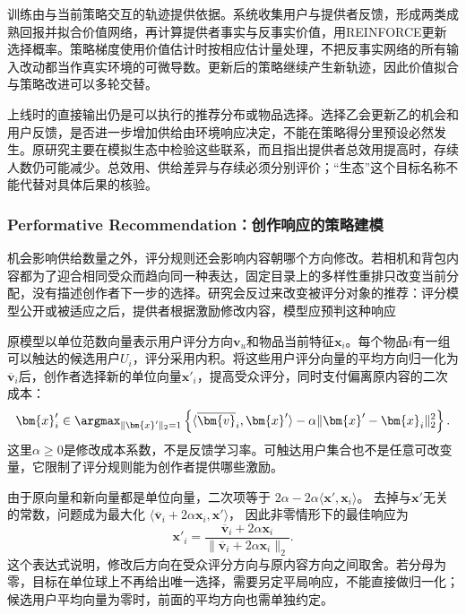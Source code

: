 训练由与当前策略交互的轨迹提供依据。系统收集用户与提供者反馈，形成两类成熟回报并拟合价值网络，再计算提供者事实与反事实价值，用REINFORCE更新选择概率。策略梯度使用价值估计时按相应估计量处理，不把反事实网络的所有输入改动都当作真实环境的可微导数。更新后的策略继续产生新轨迹，因此价值拟合与策略改进可以多轮交替。

上线时的直接输出仍是可以执行的推荐分布或物品选择。选择乙会更新乙的机会和用户反馈，是否进一步增加供给由环境响应决定，不能在策略得分里预设必然发生。原研究主要在模拟生态中检验这些联系，而且指出提供者总效用提高时，存续人数仍可能减少。总效用、供给差异与存续必须分别评价；“生态”这个目标名称不能代替对具体后果的核验。

\subsubsection{Performative Recommendation：创作响应的策略建模}
\label{sec:rs-performative-recommendation}

机会影响供给数量之外，评分规则还会影响内容朝哪个方向修改。若相机和背包内容都为了迎合相同受众而趋向同一种表达，固定目录上的多样性重排只改变当前分配，没有描述创作者下一步的选择。研究会反过来改变被评分对象的推荐：评分模型公开或被适应之后，提供者根据激励修改内容，模型应预判这种响应

原模型以单位范数向量表示用户评分方向$\bm{v}_u$和物品当前特征$\bm{x}_i$。每个物品$i$有一组可以触达的候选用户$U_i$，评分采用内积。将这些用户评分向量的平均方向归一化为$\overline{\bm{v}}_i$后，创作者选择新的单位向量$\bm{x}'_i$，提高受众评分，同时支付偏离原内容的二次成本：
\begin{equation}
 \bm{x}'_i\in
 \argmax_{\lVert\bm{x}'\rVert_2=1}
 \left\{\langle\overline{\bm{v}}_i,\bm{x}'\rangle
       -\alpha\lVert\bm{x}'-\bm{x}_i\rVert_2^2\right\}.
 \label{eq:rs-performative-response-objective}
\end{equation}
这里$\alpha\geq0$是修改成本系数，不是反馈学习率。可触达用户集合也不是任意可改变量，它限制了评分规则能为创作者提供哪些激励。

由于原向量和新向量都是单位向量，二次项等于
$2\alpha-2\alpha\langle\bm{x}',\bm{x}_i\rangle$。
去掉与$\bm{x}'$无关的常数，问题成为最大化
$\langle\overline{\bm{v}}_i+2\alpha\bm{x}_i,\bm{x}'\rangle$，
因此非零情形下的最佳响应为
\begin{equation}
 \bm{x}'_i=
 \frac{\overline{\bm{v}}_i+2\alpha\bm{x}_i}
      {\lVert\overline{\bm{v}}_i+2\alpha\bm{x}_i\rVert_2}.
 \label{eq:rs-performative-response}
\end{equation}
这个表达式说明，修改后方向在受众评分方向与原内容方向之间取舍。若分母为零，目标在单位球上不再给出唯一选择，需要另定平局响应，不能直接做归一化；候选用户平均向量为零时，前面的平均方向也需单独约定。

